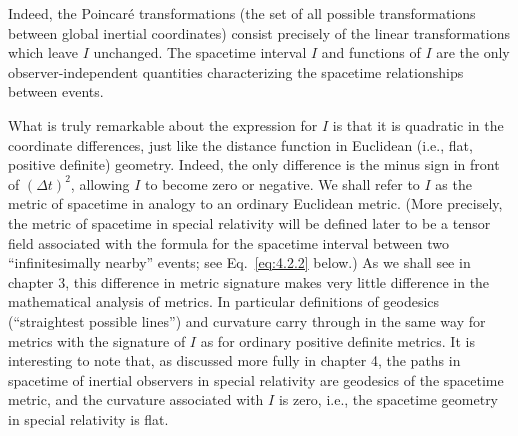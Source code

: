 Indeed, the Poincar\'e transformations (the set of all possible transformations
between global inertial coordinates) consist precisely of the linear transformations
which leave \(I\) unchanged. The spacetime interval \(I\) and functions of \(I\) are
the only observer-independent quantities characterizing the spacetime relationships
between events.

What is truly remarkable about the expression for \(I\) is that it is quadratic in the
coordinate differences, just like the distance function in Euclidean (i.e., flat,
positive definite) geometry. Indeed, the only difference is the minus sign in front of
\((\Delta t)^2\), allowing \(I\) to become zero or negative. We shall refer to \(I\) as
the metric of spacetime in analogy to an ordinary Euclidean metric. (More precisely,
the metric of spacetime in special relativity will be defined later to be a tensor field
associated with the formula for the spacetime interval between two ``infinitesimally
nearby'' events; see Eq.~\eqref{eq:4.2.2} below.) As we shall see in chapter 3, this
difference in metric signature makes very little difference in the mathematical
analysis of metrics. In particular definitions of geodesics (``straightest possible
lines'') and curvature carry through in the same way for metrics with the signature
of \(I\) as for ordinary positive definite metrics. It is interesting to note that, as
discussed more fully in chapter 4, the paths in spacetime of inertial observers in
special relativity are geodesics of the spacetime metric, and the curvature associated
with \(I\) is zero, i.e., the spacetime geometry in special relativity is flat.
